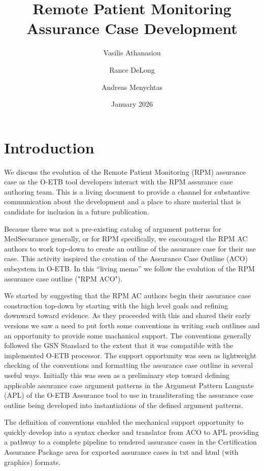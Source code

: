 \documentclass{article}
\title{Remote Patient Monitoring\\Assurance Case Development}
\author[1]{Vasilis Athanasiou}
\author[2]{Rance DeLong}
\author[1]{Andreas Menychtas}
\affil[1]{BioAssist}
\affil[2]{The Open Group}
\date{January 2026}
\begin{document}
\maketitle
\tableofcontents
\clearpage
\section{Introduction}
We discuss the evolution of the Remote Patient Monitoring (RPM) assurance case as the O-ETB tool developers interact with the RPM assurance case authoring team.
This is a living document to provide a channel for substantive communication about the development and a place to share material that is candidate for inclusion in a future publication.

Because there was not a pre-existing catalog of argument patterns for MedSecurance generally, or for RPM specifically, we encouraged the RPM AC authors to work top-down to create an outline of the assurance case for their use case.
This activity inspired the creation of the Assurance Case Outline (ACO) subsystem in O-ETB.
In this ``living memo'' we follow the evolution of the RPM assurance case outline ("RPM ACO").

We started by suggesting that the RPM AC authors begin their assurance case construction top-down by starting with the high level goals and refining downward toward evidence.
As they proceeded with this and shared their early versions we saw a need to put forth some conventions in writing such outlines and an opportunity to provide some machanical support.
The conventions generally followed the GSN Standard to the extent that it was compatible with the implemented O-ETB processor.
The support opportunity was seen as lightweight checking of the conventions and formatting the assurance case outline in several useful ways.
Initially this was seen as a preliminary step toward defining applicable assurance case argument patterns in the Argument Pattern Languate (APL) of the O-ETB Assurance tool to use in transliterating the assurance case outline being developed into instantiations of the defined argument patterns.

The definition of conventions enabled the mechanical support opportunity to quickly develop into a syntax checker and translator from ACO to APL providing a pathway to a complete pipeline to rendered assurance cases in the Certification Assurance Package area for exported assurance cases in txt and html (with graphics) formats.
\end{document}
